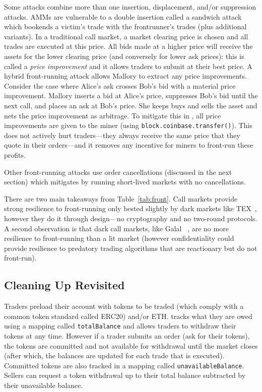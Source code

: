 Some attacks combine more than one insertion, displacement, and/or suppression attacks. AMMs are vulnerable to a double insertion called a sandwich attack~\cite{ZQFLG21} which bookends a victim's trade with the frontrunner's trades (plus additional variants). In a traditional call market, a market clearing price is chosen and all trades are executed at this price. All bids made at a higher price will receive the assets for the lower clearing price (and conversely for lower ask prices): this is called a \textit{price improvement} and it allows traders to submit at their best price. A hybrid front-running attack allows Mallory to extract any price improvements. Consider the case where Alice's ask crosses Bob's bid with a material price improvement. Mallory inserts a bid at Alice's price, suppresses Bob's bid until the next call, and places an ask at Bob's price. She keeps buys and sells the asset and nets the price improvement as arbitrage. To mitigate this in \cm, all price improvements are given to the miner (using \texttt{block.coinbase.transfer()}). This does not actively hurt traders---they always receive the same price that they quote in their orders---and it removes any incentive for miners to front-run these profits. 

Other front-running attacks use order cancellations (discussed in the next section) which \cm mitigates by running short-lived markets with no cancellations. 

There are two main takeaways from Table~\ref{tab:front}. Call markets provide strong resilience to front-running only bested slightly by dark markets like TEX~\cite{khalil2019tex}, however they do it through design---no cryptography and no two-round protocols. A second observation is that dark call markets, like Galal \etal~\cite{galalpublicly}, are no more resilience to front-running than a lit market (however confidentiality could provide resilience to predatory trading algorithms that are reactionary but do not front-run).

\subsection{Cleaning Up Revisited}

 Traders preload their account with tokens to be traded (which comply with a common token standard called ERC20) and/or ETH. \cm tracks what they are owed using a mapping called \texttt{totalBalance} and allows traders to withdraw their tokens at any time. However if a trader submits an order (\ie ask for their tokens), the tokens are committed and not available for withdrawal until the market closes (after which, the balances are updated for each trade that is executed). Committed tokens are also tracked in a mapping called \texttt{unavailableBalance}. Sellers can request a token withdrawal up to their total balance subtracted by their unavailable balance.

